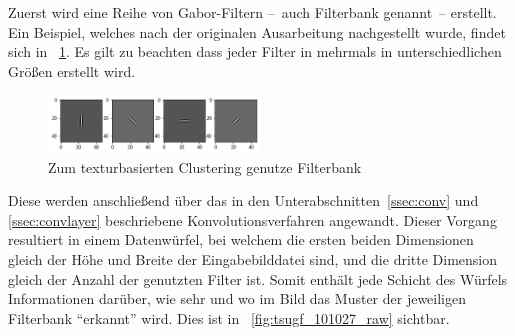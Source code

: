Zuerst wird eine Reihe von Gabor-Filtern --~auch Filterbank genannt~-- erstellt. Ein Beispiel, welches nach der originalen Ausarbeitung nachgestellt wurde, findet sich in \figurename~\ref{fig:tsugf_filters}. Es gilt zu beachten dass jeder Filter in mehrmals in unterschiedlichen Größen erstellt wird.

\begin{figure}[h!]
	\centering
	\includegraphics[width=0.5\textwidth,keepaspectratio]{images/gen/GEN_tsugf_filterbank.png}
	\captionsetup{width=0.5\textwidth,format=plain}
	\caption{Zum texturbasierten Clustering genutze Filterbank}
	\label{fig:tsugf_filters}
\end{figure}

Diese werden anschließend über das in den Unterabschnitten~\ref{ssec:conv} und \ref{ssec:convlayer} beschriebene Konvolutionsverfahren angewandt. Dieser Vorgang resultiert in einem Datenwürfel, bei welchem die ersten beiden Dimensionen gleich der Höhe und Breite der Eingabebilddatei sind, und die dritte Dimension gleich der Anzahl der genutzten Filter ist. Somit enthält jede Schicht des Würfels Informationen darüber, wie sehr und wo im Bild das Muster der jeweiligen Filterbank \enquote{erkannt} wird. Dies ist in \figurename~\ref{fig:tsugf_101027_raw} sichtbar.

